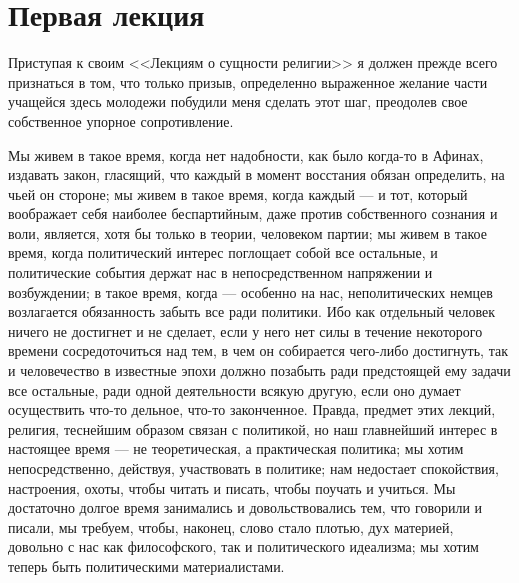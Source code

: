 \documentclass[12pt]{article}
\begin{document}
{}
\section*{Первая лекция}

Приступая к своим <<Лекциям о сущности религии>>  я должен прежде всего признаться в том, что только призыв, определенно выраженное желание части учащейся здесь молодежи побудили меня сделать этот шаг, преодолев свое собственное упорное сопротивление. 

Мы живем в такое время, когда нет надобности, как было когда-то в Афинах, издавать закон, гласящий, что каждый в момент восстания обязан определить, на чьей он стороне; мы живем в такое время, когда каждый --- и тот, который воображает себя наиболее беспартийным, даже против собственного сознания и воли, является, хотя бы только в теории, человеком партии; мы живем в такое время, когда политический интерес поглощает собой все остальные, и политические события держат нас в непосредственном напряжении и возбуждении; в такое время, когда --- особенно на нас, неполитических немцев возлагается обязанность забыть все ради политики. Ибо как отдельный человек ничего не достигнет и не сделает, если у него нет силы в течение некоторого времени сосредоточиться над тем, в чем он собирается чего-либо достигнуть, так и человечество в известные эпохи должно позабыть ради предстоящей ему задачи все остальные, ради одной деятельности всякую другую, если оно думает осуществить что-то дельное, что-то законченное. Правда, предмет этих лекций, религия, теснейшим образом связан с политикой, но наш главнейший интерес в настоящее время --- не теоретическая, а практическая политика; мы хотим непосредственно, действуя, участвовать в политике; нам недостает спокойствия, настроения, охоты, чтобы читать и писать, чтобы поучать и учиться. Мы достаточно долгое время занимались и довольствовались тем, что говорили и писали, мы требуем, чтобы, наконец, слово стало плотью, дух материей, довольно с нас как философского, так и политического идеализма; мы хотим теперь быть политическими материалистами. 
\end{document}
